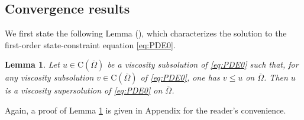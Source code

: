 \documentclass[12pt,reqno]{amsart}
\numberwithin{figure}{section}
\theoremstyle{plain}
\newtheorem{lem}[thm]{Lemma}
\theoremstyle{remark}
\numberwithin{equation}{section}
\newcommand{\rmC}{\mathrm{C}}
\begin{document}
\subsection{Convergence results} We first state the following Lemma (\cite{Capuzzo-Dolcetta1990}), which characterizes the solution to the first-order state-constraint  equation \eqref{eq:PDE0}.
\begin{lem}\label{lem:max} Let $u\in \rmC(\overline{\Omega})$ be a viscosity subsolution of \eqref{eq:PDE0} such that, for any viscosity subsolution $v\in \rmC(\overline{\Omega})$ of \eqref{eq:PDE0}, one has $v\leq u$ on $\overline{\Omega}$. Then $u$ is a viscosity supersolution of \eqref{eq:PDE0} on $\overline{\Omega}$.
\end{lem}
\noindent Again, a proof of Lemma \ref{lem:max} is given in Appendix for the reader's convenience.
\end{document}
